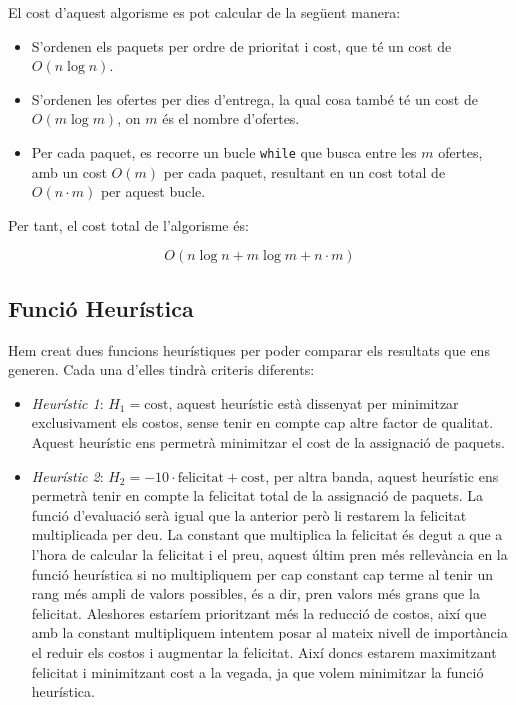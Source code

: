 \documentclass[a4paper]{article}
\begin{document}
	El cost d'aquest algorisme es pot calcular de la següent manera:
	
	\begin{itemize}
		\item S'ordenen els paquets per ordre de prioritat i cost, que té un cost de $O(n \log n)$.
		\item S'ordenen les ofertes per dies d'entrega, la qual cosa també té un cost de $O(m \log m)$, on $m$ és el nombre d'ofertes.
		\item Per cada paquet, es recorre un bucle \texttt{while} que busca entre les $m$ ofertes, amb un cost $O(m)$ per cada paquet, resultant en un cost total de $O(n \cdot m)$ per aquest bucle.
	\end{itemize}
	
	Per tant, el cost total de l'algorisme és:
	
	\[
	O(n \log n + m \log m + n \cdot m)
	\]
		
	\subsection{Funció Heurística}
	
	Hem creat dues funcions heurístiques per poder comparar els resultats que ens generen. Cada una d'elles tindrà criteris diferents:
	
	\begin{itemize}
		\item \emph{Heurístic 1}: $H_1 = \text{cost}$, aquest heurístic està dissenyat per minimitzar exclusivament els costos, sense tenir en compte cap altre factor de qualitat. Aquest heurístic ens permetrà minimitzar el cost de la assignació de paquets.
		\item \emph{Heurístic 2}: $H_2 = -10 \cdot \text{felicitat} + \text{cost}$, per altra banda, aquest heurístic ens permetrà tenir en compte la felicitat total de la assignació de paquets. La funció d'evaluació serà igual que la anterior però li restarem la felicitat multiplicada per deu. La constant que multiplica la felicitat és degut a que a l'hora de calcular la felicitat i el preu, aquest últim pren més rellevància en la funció heurística si no multipliquem per cap constant cap terme al tenir un rang més ampli de valors possibles, és a dir, pren valors més grans que la felicitat. Aleshores estaríem prioritzant més la reducció de costos, així que amb la constant multipliquem intentem posar al mateix nivell de importància el reduir els costos i augmentar la felicitat. Així doncs estarem maximitzant felicitat i minimitzant cost a la vegada, ja que volem minimitzar la funció heurística.
	\end{itemize}
	
\end{document}
